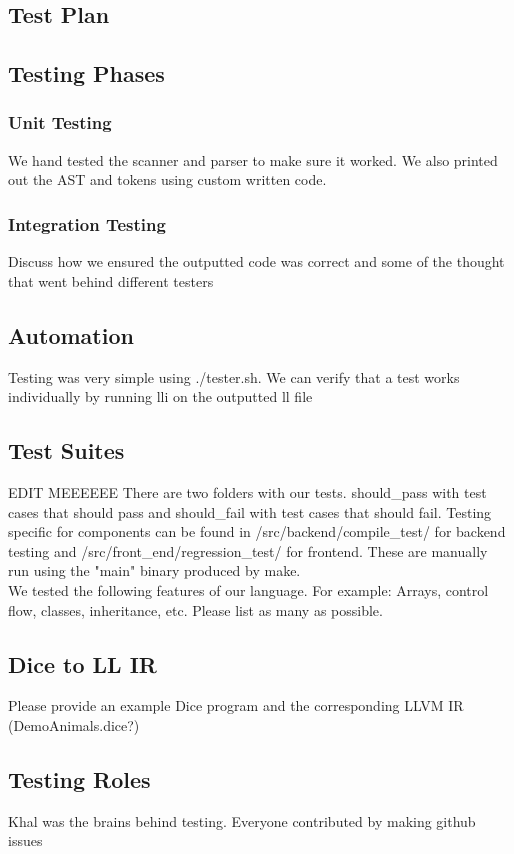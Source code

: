 \begin{homeworkProblem}
	\chapter{Test Plan}
	\section{Testing Phases}
	\subsection{Unit Testing}
	We hand tested the scanner and parser to make sure it worked. We also printed out the AST and tokens using custom written code. 
	\subsection{Integration Testing}
	Discuss how we ensured the outputted code was correct and some of the thought that went behind different testers
	\section{Automation}
	Testing was very simple using ./tester.sh. We can verify that a test works individually by running lli on the outputted ll file
	\section{Test Suites}
	EDIT MEEEEEE
	There are two folders with our tests. should\_pass with test cases that should pass and should\_fail with
	test cases that should fail. Testing specific for components can be found in /src/backend/compile\_test/ for
	backend testing and /src/front\_end/regression\_test/ for frontend. These are manually run using the "main"
	binary produced by make.\\
	
	We tested the following features of our language. For example: Arrays, control flow, classes, inheritance, etc. Please list as many as possible.\\
	
	\section{Dice to LL IR}
	Please provide an example Dice program and the corresponding LLVM IR (DemoAnimals.dice?)
	
	\section{Testing Roles}
	Khal was the brains behind testing. Everyone contributed by making github issues
\end{homeworkProblem}